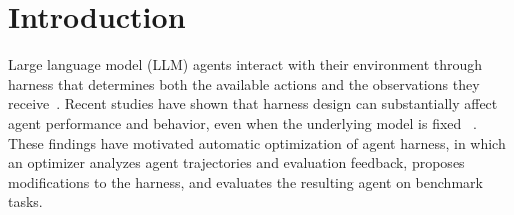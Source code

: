 \section{Introduction}
\label{sec:introduction}



Large language model (LLM) agents interact with their environment through harness that determines both the available actions and the observations they receive~\citep{yang2024sweagent,merrill2026terminalbench,lin2026agentic}.
%
Recent studies have shown that harness design can substantially affect agent performance and behavior, even when the underlying model is fixed ~\citep{lin2026agentic,wang2026harnessevolution}.
%
These findings have motivated automatic optimization of agent harness, in which an
optimizer analyzes agent trajectories and evaluation feedback, proposes modifications
to the harness, and evaluates the resulting agent on benchmark tasks.


